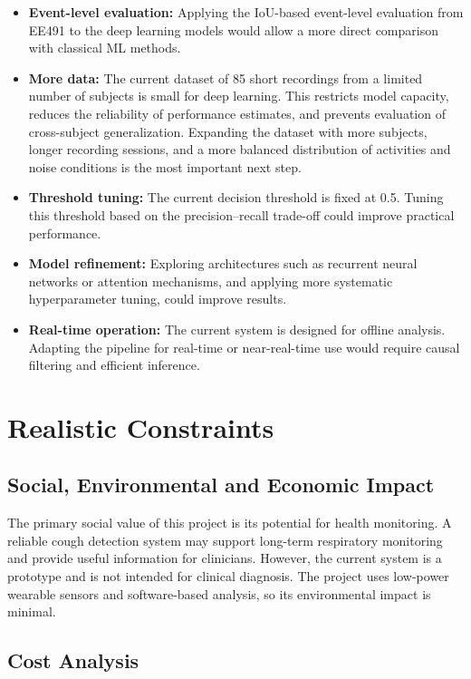 \begin{itemize}[nosep]
    \item \textbf{Event-level evaluation:} Applying the IoU-based event-level evaluation from EE491 to the deep learning models would allow a more direct comparison with classical ML methods.
    \item \textbf{More data:} The current dataset of 85 short recordings from a limited number of subjects is small for deep learning. This restricts model capacity, reduces the reliability of performance estimates, and prevents evaluation of cross-subject generalization. Expanding the dataset with more subjects, longer recording sessions, and a more balanced distribution of activities and noise conditions is the most important next step.
    \item \textbf{Threshold tuning:} The current decision threshold is fixed at 0.5. Tuning this threshold based on the precision--recall trade-off could improve practical performance.
    \item \textbf{Model refinement:} Exploring architectures such as recurrent neural networks or attention mechanisms, and applying more systematic hyperparameter tuning, could improve results.
    \item \textbf{Real-time operation:} The current system is designed for offline analysis. Adapting the pipeline for real-time or near-real-time use would require causal filtering and efficient inference.
\end{itemize}

\section{Realistic Constraints}

\subsection{Social, Environmental and Economic Impact}

The primary social value of this project is its potential for health monitoring. A reliable cough detection system may support long-term respiratory monitoring and provide useful information for clinicians. However, the current system is a prototype and is not intended for clinical diagnosis. The project uses low-power wearable sensors and software-based analysis, so its environmental impact is minimal.

\subsection{Cost Analysis}

